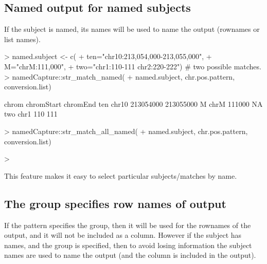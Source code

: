 \subsection{Named output for named subjects}

If the subject is named, its names will be used to name the output
(rownames or list names).

\begin{Schunk}
\begin{Sinput}
> named.subject <- c(
+   ten="chr10:213,054,000-213,055,000",
+   M="chrM:111,000",
+   two="chr1:110-111 chr2:220-222") # two possible matches.
> namedCapture::str_match_named(
+   named.subject, chr.pos.pattern, conversion.list)
\end{Sinput}
\begin{Soutput}
    chrom chromStart  chromEnd
ten chr10  213054000 213055000
M    chrM     111000        NA
two  chr1        110       111
\end{Soutput}
\begin{Sinput}
> namedCapture::str_match_all_named(
+   named.subject, chr.pos.pattern, conversion.list)
\end{Sinput}
\begin{Sinput}
> 
\end{Sinput}
\end{Schunk}

This feature makes it easy to select particular subjects/matches by
name. 

\subsection{The  group specifies row names of output}

If the pattern specifies the  group, then it will be used
for the rownames of the output, and it will not be included as a
column. However if the subject has names, and the  group is
specified, then to avoid losing information the subject names are used
to name the output (and the  column is included in the
output).

